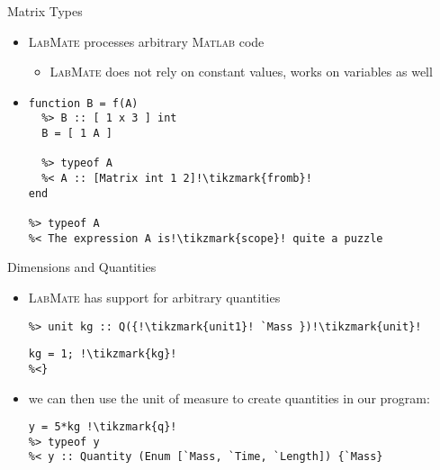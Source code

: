 \documentclass[]{beamer}
\newcommand{\tikzmark}[1]{\tikz[overlay,remember picture,baseline=-0.5ex] \node (#1) {};}
\newcommand{\lm}{\textsc{LabMate}\xspace}
\newcommand{\ma}{\textsc{Matlab}\xspace}
\begin{document}
\begin{frame}[fragile]{Matrix Types}
  \begin{itemize}[<+->]
  \item \lm processes arbitrary \ma code
    \begin{itemize}
    \item \lm does not rely on constant values, works on variables as well
    \end{itemize}
  \item
\begin{lstlisting}[xleftmargin=0em]
function B = f(A)
  %> B :: [ 1 x 3 ] int
  B = [ 1 A ]

  %> typeof A
  %< A :: [Matrix int 1 2]!\tikzmark{fromb}!
end

%> typeof A
%< The expression A is!\tikzmark{scope}! quite a puzzle
\end{lstlisting}
   \pause
  \end{itemize}
\end{frame}

\begin{frame}[fragile]{Dimensions and Quantities}
  \begin{itemize}[<+->]
  \item \lm has support for arbitrary quantities
    \begin{lstlisting}[xleftmargin=0em,belowskip=-1em]
%> dimensions V for Q over `Mass, `Time, `Length!\tikzmark{base}!
%> unit kg :: Q({!\tikzmark{unit1}! `Mass })!\tikzmark{unit}!
\end{lstlisting}
\pause
\pause
\begin{lstlisting}[xleftmargin=0em]
%<{
kg = 1; !\tikzmark{kg}!
%<}
\end{lstlisting}
\pause
\pause
\item we can then use the unit of measure to create quantities in our program:
\begin{lstlisting}[xleftmargin=0em]
y = 5*kg !\tikzmark{q}!
%> typeof y
%< y :: Quantity (Enum [`Mass, `Time, `Length]) {`Mass}
\end{lstlisting}
  \pause
  \end{itemize}
\end{frame}
\end{document}
